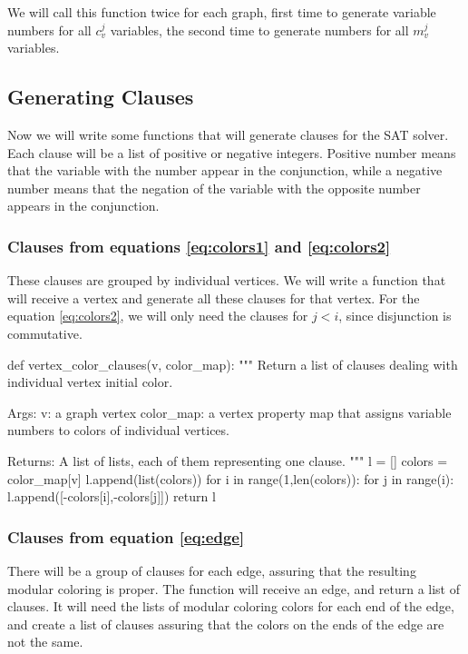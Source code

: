 \documentclass[letterpaper]{article}
\begin{document}
We will call this function twice for each graph, first time to generate
variable numbers for all $c_v^j$ variables, the second time to generate numbers
for all $m_v^j$ variables. 

\subsection{Generating Clauses}

Now we will write some functions that will generate clauses for the SAT solver.
Each clause will be a list of positive or negative integers.  Positive number
means that the variable with the number appear in the conjunction, while a
negative number means that the negation of the variable with the opposite
number appears in the conjunction. 

\subsubsection{Clauses from equations \eqref{eq:colors1} and \eqref{eq:colors2}}

These clauses are grouped by individual vertices.  We will write a function
that will receive a vertex and generate all these clauses for that vertex.  For
the equation \eqref{eq:colors2}, we will only need the clauses for $j < i$,
since disjunction is commutative.

\begin{pyblock}
def vertex_color_clauses(v, color_map):
   """
   Return a list of clauses dealing with individual vertex 
   initial color.

   Args:
      v: a graph vertex
      color_map: a vertex property map that assigns variable 
      numbers to colors of individual vertices.

   Returns:
      A list of lists, each of them representing one clause.
   """
   l = []
   colors = color_map[v]
   l.append(list(colors))
   for i in range(1,len(colors)):
      for j in range(i):
         l.append([-colors[i],-colors[j]])
   return l
\end{pyblock}

\subsubsection{Clauses from equation \eqref{eq:edge}}

There will be a group of clauses for each edge, assuring that the resulting
modular coloring is proper.  The function will receive an edge, and return a
list of clauses. It will need the lists of modular coloring colors for each end
of the edge, and create a list of clauses assuring that the colors on the ends
of the edge are not the same.  
\end{document}
